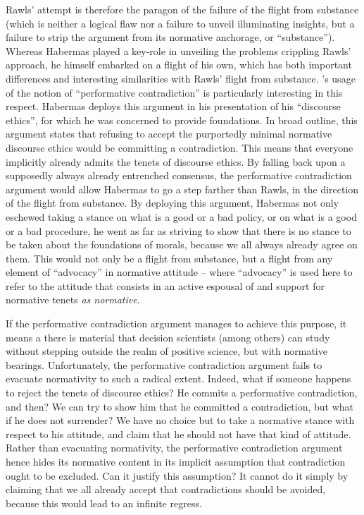 \documentclass[preprint,11pt]{elsarticle}
\begin{document}
Rawls' attempt is therefore the paragon of the failure of the flight from substance (which is neither a logical flaw nor a failure to unveil illuminating insights, but a failure to strip the argument from its normative anchorage, or ``substance''). Whereas Habermas played a key-role in unveiling the problems crippling Rawls' approach, he himself embarked on a flight of his own, which has both important differences and interesting similarities with Rawls' flight from substance. \cite{habermas_moralbewustsein_1983}'s usage of the notion of ``performative contradiction'' is particularly interesting in this respect. Habermas deploys this argument in his presentation of his ``discourse ethics'', for which he was concerned to provide foundations. In broad outline, this argument states that refusing to accept the purportedly minimal normative discourse ethics would be committing a contradiction. This means that everyone implicitly already admits the tenets of discourse ethics. By falling back upon a supposedly always already entrenched consensus, the performative contradiction argument would allow Habermas to go a step farther than Rawls, in the direction of the flight from substance. By deploying this argument, Habermas not only eschewed taking a stance on what is a good or a bad policy, or on what is a good or a bad procedure, he went as far as striving to show that there is no stance to be taken about the foundations of morals, because we all always already agree on them. This would not only be a flight from substance, but a flight from any element of ``advocacy'' in normative attitude -- where ``advocacy'' is used here to refer to the attitude that consists in an active espousal of and support for normative tenets \emph{as normative}. 

If the performative contradiction argument manages to achieve this purpose, it means a there is material that decision scientists (among others) can study without stepping outside the realm of positive science, but with normative bearings. Unfortunately, the performative contradiction argument fails to evacuate normativity to such a radical extent. Indeed, what if someone happens to reject the tenets of discourse ethics? He commits a performative contradiction, and then? We can try to show him that he committed a contradiction, but what if he does not surrender? We have no choice but to take a normative stance with respect to his attitude, and claim that he should not have that kind of attitude. Rather than evacuating normativity, the performative contradiction argument hence hides its normative content in its implicit assumption that contradiction ought to be excluded. Can it justify this assumption? It cannot do it simply by claiming that we all already accept that contradictions should be avoided, because this would lead to an infinite regress.
\end{document}
